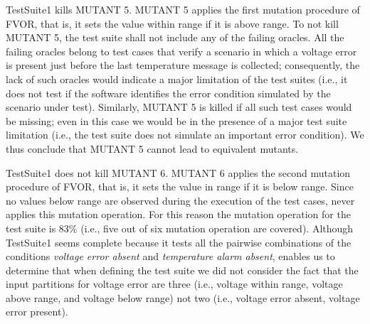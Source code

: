 TestSuite1 kills MUTANT 5. MUTANT 5 applies the first mutation procedure of FVOR, that is, it sets the value within range if it is above range. 
To not kill MUTANT 5, the test suite shall not include any of the failing oracles. All the failing oracles belong to test cases that verify a scenario in which a voltage error is present just before the last temperature message is collected; consequently, the lack of such oracles would indicate a major limitation of the test suites (i.e., it does not test if the software identifies the error condition simulated by the scenario under test). Similarly, MUTANT 5 is killed if all such test cases would be missing; even in this case we would be in the presence of a major test suite limitation (i.e., the test suite does not simulate an important error condition). We thus conclude that MUTANT 5 cannot lead to equivalent mutants. 

TestSuite1 does not kill MUTANT 6. MUTANT 6 applies the second mutation procedure of FVOR, that is, it sets the value in range if it is below range. Since no values below range are observed during the execution of the test cases, \APPR never applies this mutation operation. For this reason the mutation operation for the test suite is 83\% (i.e., five out of six mutation operation are covered). Although TestSuite1 seems complete because it tests all the pairwise combinations of the conditions \emph{voltage error absent} and \emph{temperature alarm absent}, \APPR enables us to determine that when defining the test suite we did not consider the fact that the input partitions for voltage error are three (i.e., voltage within range, voltage above range, and voltage below range) not two (i.e., voltage error absent, voltage error present).




